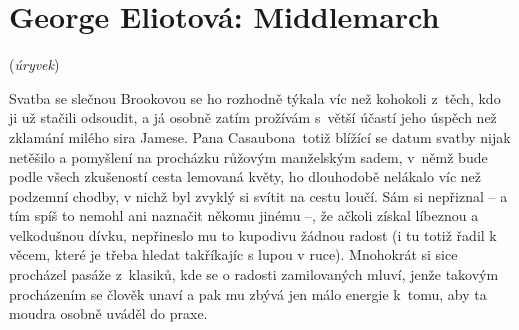 \section{George Eliotová: Middlemarch}

\noindent
(\textit{úryvek})

\medskip

\noindent
Svatba se slečnou Brookovou se ho rozhodně týkala víc než kohokoli z těch, kdo ji už stačili odsoudit, a já osobně zatím prožívám s větší účastí jeho úspěch než zklamání milého sira Jamese. Pana Casaubona totiž blížící se datum svatby nijak netěšilo a pomyšlení na procházku růžovým manželským sadem, v němž bude podle všech zkušeností cesta lemovaná květy, ho dlouhodobě nelákalo víc než podzemní chodby, v nichž byl zvyklý si svítit na cestu loučí. Sám si nepřiznal -- a tím spíš to nemohl ani naznačit někomu jinému --, že ačkoli získal líbeznou a velkodušnou dívku, nepřineslo mu to kupodivu žádnou radost (i tu totiž řadil k věcem, které je třeba hledat takříkajíc s lupou v ruce). Mnohokrát si sice procházel pasáže z klasiků, kde se o radosti zamilovaných mluví, jenže takovým procházením se člověk unaví a pak mu zbývá jen málo energie k tomu, aby ta moudra osobně uváděl do praxe.   

